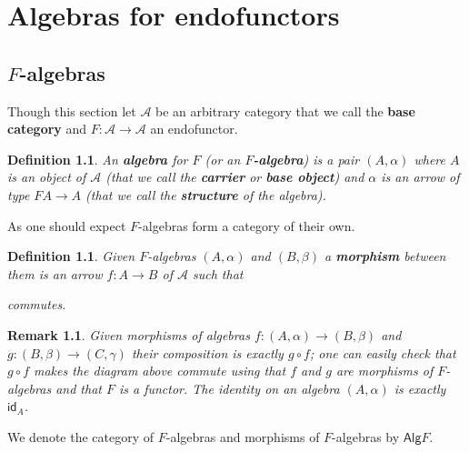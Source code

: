 \documentclass[letterpaper, 11pt, oneside]{memoir}
\theoremstyle{myteo}
\newtheorem{definition}[theorem]{Definition}
\newtheorem{remark}[theorem]{Remark}
\numberwithin{equation}{section}
\newcommand{\marginnote}[1]{\marginpar{\footnotesize #1}}
\newcommand{\id}{\textsf{id}}
\newcommand{\alg}{\textsf{Alg}}
\begin{document}
\chapter{Algebras for endofunctors}
\newpage

\section{\(F\)-algebras}

Though this section let \(\mathscr{A}\) be an arbitrary category that we call the \textbf{base category} and \(F \colon \mathscr{A} \to \mathscr{A}\) an endofunctor.

\begin{definition}
  An \textbf{algebra} for \(F\) (or an \textbf{\(F\)-algebra}) is a pair \((A, \alpha)\) where \(A\) is an object of \(\mathscr{A}\) (that we call the \textbf{carrier} or \textbf{base object}) \marginnote{\(F\)-algebra} and \(\alpha\) is an arrow of type \(FA \to A\) (that we call the \textbf{structure} of the algebra).
\end{definition}

As one should expect \(F\)-algebras form a category of their own.

\begin{definition}
  Given \(F\)-algebras \((A, \alpha)\) and \((B, \beta)\) a \textbf{morphism} between them is an arrow \(f: A \to B\) of \(\mathscr{A}\) such that
  \begin{center}
  \end{center}
  commutes.
\end{definition}

\begin{remark}
  Given morphisms of algebras \(f \colon (A, \alpha) \to (B, \beta)\) and \(g \colon (B, \beta) \to (C, \gamma)\) their composition is exactly \(g \circ f\); one can easily check that \(g \circ f\) makes the diagram above commute using that \(f\) and \(g\) are morphisms of \(F\)-algebras and that \(F\) is a functor.
  The identity on an algebra \((A, \alpha)\) is exactly \(\id_A\).
\end{remark}

We denote the category of \(F\)-algebras and morphisms of \(F\)-algebras by \(\alg F\).
\marginnote{\(\alg F\)}
\end{document}
